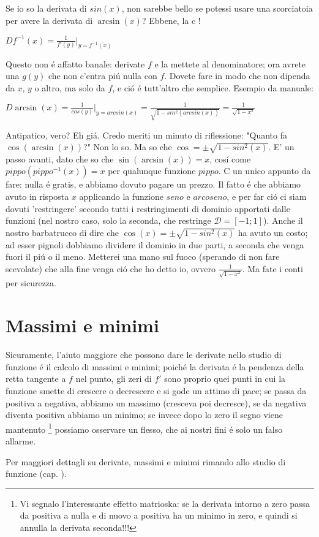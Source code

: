 Se io so la derivata di $sin(x)$, non sarebbe bello se potessi usare una scorciatoia per avere la derivata di $\arcsin(x)$? Ebbene, la c
!

$D f^{-1}(x) = \frac{1}{f'(y)} \bigg|_{y=f^{-1}(x)}$


Questo non \'e affatto banale: derivate $f$ e la mettete al denominatore; ora avrete una $g(y)$ che non c'entra pi\'u nulla con $f$. Dovete fare in modo che non dipenda da $x$, $y$ o altro, ma solo da $f$, e ci\'o \'e tutt'altro che semplice. Esempio da manuale:

$D \arcsin(x)= \frac{1}{cos(y)} \bigg|_{y=arcsin(x)}=\frac{1}{\sqrt{1-sin^2(arcsin(x))}}=\frac{1}{\sqrt{1-x^2}}$

Antipatico, vero? Eh gi\'a. Credo meriti un minuto di riflessione: "Quanto fa $\cos(\arcsin(x))$?" Non lo so. Ma so che $\cos = \pm \sqrt{1-sin^2(x)}$. E' un passo avanti, dato che so che $\sin(\arcsin(x))=x$, cos\'i come $pippo(pippo^{-1}(x))=x$ per qualunque funzione $pippo$. C
 un unico appunto da fare: nulla \'e gratis, e abbiamo dovuto pagare un prezzo. Il fatto \'e che abbiamo avuto in risposta $x$ applicando la funzione $seno$ e $arcoseno$, e per far ci\'o ci siam dovuti 'restringere' secondo tutti i restringimenti di dominio apportati dalle funzioni (nel nostro caso, solo la seconda, che restringe $\mathcal{D}=[-1;1]$). Anche il nostro barbatrucco di dire che $\cos(x)=\pm \sqrt{1-sin^2(x)}$ ha avuto un costo; ad esser pignoli dobbiamo dividere il dominio in due parti, a seconda che venga fuori il pi\'u o il meno.
 Metterei una mano sul fuoco (sperando di non fare scevolate) che alla fine venga ci\'o che ho detto io, ovvero  $\frac{1}{\sqrt{1-x^2}}$. Ma fate i conti per sicurezza.


\section{Massimi e minimi}

Sicuramente, l'aiuto maggiore che possono dare le derivate nello studio di funzione \'e il calcolo di massimi e minimi; poich\'e la derivata \'e la pendenza della retta tangente a $f$ nel punto, gli zeri di $f'$ sono proprio quei punti in cui la funzione smette di crescere o decrescere e si gode un attimo di pace; se passa da positiva a negativa, abbiamo un massimo (cresceva poi decresce), se da negativa diventa positiva abbiamo un minimo; se invece dopo lo zero il segno viene mantenuto \footnote{Vi segnalo l'interessante effetto matrioska: se la derivata intorno a zero passa da positiva a nulla e di nuovo a positiva ha un minimo in zero, e quindi si annulla la derivata seconda!!!} possiamo osservare un flesso, che ai nostri fini \'e solo un falso allarme.

Per maggiori dettagli su derivate, massimi e minimi rimando allo studio di funzione (cap. ).




